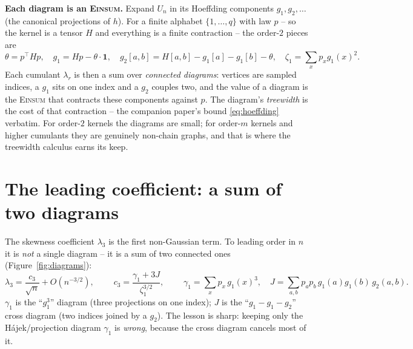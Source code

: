 \documentclass[11pt]{article}
\newcommand{\Einsum}{\textsc{Einsum}}
\newcommand{\F}[1]{\smallskip\noindent\textbf{\textsf{#1.}}\hspace{0.4em}}
\theoremstyle{plain}
\theoremstyle{definition}
\begin{document}
\F{Each diagram is an \Einsum} Expand $U_n$ in its Hoeffding components
$g_1,g_2,\dots$ (the canonical projections of $h$). For a finite alphabet
$\{1,\dots,q\}$ with law $p$ -- so the kernel is a tensor $H$ and everything is a
finite contraction -- the order-$2$ pieces are
\begin{equation}
\label{eq:hoeffding}
   \theta=p^\top\!Hp,\quad
   g_1=Hp-\theta\!\cdot\!\mathbf 1,\quad
   g_2[a,b]=H[a,b]-g_1[a]-g_1[b]-\theta,\quad
   \zeta_1=\textstyle\sum_x p_x g_1(x)^2 .
\end{equation}
Each cumulant $\lambda_r$ is then a sum over \emph{connected diagrams}: vertices
are sampled indices, a $g_1$ sits on one index and a $g_2$ couples two, and the
value of a diagram is the \Einsum{} that contracts these components against $p$.
The diagram's \emph{treewidth} is the cost of that contraction -- the companion
paper's bound \eqref{eq:hoeffding} verbatim. For order-$2$ kernels the diagrams
are small; for order-$m$ kernels and higher cumulants they are genuinely
non-chain graphs, and that is where the treewidth calculus earns its keep.

\section{The leading coefficient: a sum of two diagrams}

The skewness coefficient $\lambda_3$ is the first non-Gaussian term. To leading
order in $n$ it is \emph{not} a single diagram -- it is a sum of two connected
ones (Figure~\ref{fig:diagrams}):
\begin{equation}
\label{eq:c3}
   \lambda_3=\frac{c_3}{\sqrt n}+O(n^{-3/2}),
   \qquad
   \boxed{\;c_3=\frac{\gamma_1+3J}{\zeta_1^{3/2}},\;}
   \qquad
   \gamma_1=\!\sum_x p_x\,g_1(x)^3,
   \quad
   J=\!\sum_{a,b}p_a p_b\,g_1(a)g_1(b)\,g_2(a,b).
\end{equation}
$\gamma_1$ is the ``$g_1^3$'' diagram (three projections on one index); $J$ is the
``$g_1\!-\!g_1\!-\!g_2$'' cross diagram (two indices joined by a $g_2$). The
lesson is sharp: keeping only the H\'ajek/projection diagram $\gamma_1$ is
\emph{wrong}, because the cross diagram cancels most of it.
\end{document}

